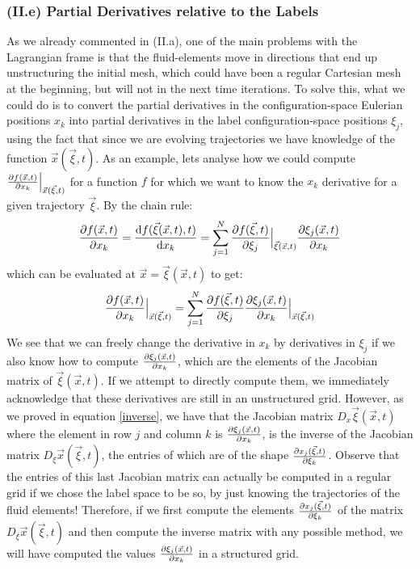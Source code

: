 \documentclass[11pt, a4paper]{article} %
\begin{document}
\subsubsection*{(II.e) Partial Derivatives relative to the Labels}
As we already commented in (II.a), one of the main problems with the Lagrangian frame is that the fluid-elements move in directions that end up unstructuring the initial mesh, which could have been a regular Cartesian mesh at the beginning, but will not in the next time iterations. To solve this, what we could do is to convert the partial derivatives in the configuration-space Eulerian positions $x_k$ into partial derivatives in the label configuration-space positions $\xi_j$, using the fact that since we are evolving trajectories we have knowledge of the function $\vec{x}(\vec{\xi},t)$. As an example, lets analyse how we could compute $\pdv{f(\vec{x},t)}{x_k}\Big\rvert_{\vec{x}(\vec{\xi},t)}$ for a function $f$ for which we want to know the $x_k$ derivative for a given trajectory $\vec{\xi}$. By the chain rule:
\begin{equation}
\pdv{f(\vec{x},t)}{x_k}=\dv{f(\vec{\xi}(\vec{x},t),t)}{x_k}=\sum_{j=1}^N \pdv{f(\vec{\xi},t)}{\xi_j}\Big\rvert_{\vec{\xi}(\vec{x},t)} \pdv{\xi_j(\vec{x},t)}{x_k}
\end{equation}
which can be evaluated at $\vec{x}=\vec{\xi}(\vec{x},t)$ to get:
\begin{equation}
\pdv{f(\vec{x},t)}{x_k}\Big\rvert_{\vec{x}(\vec{\xi},t)}=\sum_{j=1}^N \pdv{f(\vec{\xi},t)}{\xi_j} \pdv{\xi_j(\vec{x},t)}{x_k}\Big\rvert_{\vec{x}(\vec{\xi},t)}
\end{equation}
We see that we can freely change the derivative in $x_k$ by derivatives in $\xi_j$ if we also know how to compute $\pdv{\xi_j(\vec{x},t)}{x_k}$, which are the elements of the Jacobian matrix of $\vec{\xi}(\vec{x},t)$. If we attempt to directly compute them, we immediately acknowledge that these derivatives are still in an unstructured grid. However, as we proved in equation \eqref{inverse}, we have that the Jacobian matrix $D_x \vec{\xi}(\vec{x},t)$ where the element in row $j$ and column $k$ is $\pdv{\xi_j(\vec{x},t)}{x_k}$, is the inverse of the Jacobian matrix $D_\xi \vec{x}(\vec{\xi},t)$, the entries of which are of the shape $\pdv{x_j(\vec{\xi},t)}{\xi_k}$. Observe that the entries of this last Jacobian matrix can actually be computed in a regular grid if we chose the label space to be so, by just knowing the trajectories of the fluid elements! Therefore, if we first compute the elements $\pdv{x_j(\vec{\xi},t)}{\xi_k}$ of the matrix $D_\xi \vec{x}(\vec{\xi},t)$ and then compute the inverse matrix with any possible method, we will have computed the values $\pdv{\xi_j(\vec{x},t)}{x_k}$ in a structured grid.
\end{document}

